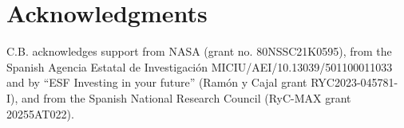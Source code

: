 \section*{Acknowledgments}
C.B. acknowledges support from NASA (grant no. 80NSSC21K0595), from the Spanish Agencia Estatal de Investigaci\'on MICIU/AEI/10.13039/501100011033 and by ``ESF Investing in your future'' (Ram\'on y Cajal grant RYC2023-045781-I), and from the Spanish National Research Council (RyC-MAX grant 20255AT022).
